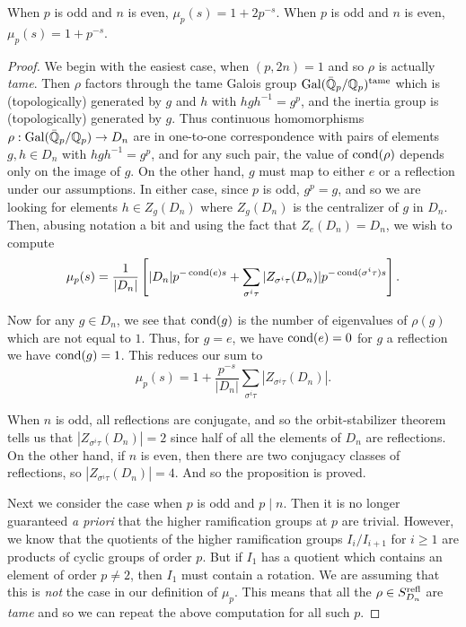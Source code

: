 \begin{prop}\label{prop:finiteprimesoddp}
  When $p$ is odd and $n$ is even, $\mu_p(s) = 1 + 2p^{-s}$. When $p$ is odd
and $n$ is even, $\mu_p(s) = 1 + p^{-s}$.
\end{prop}
\begin{proof}
We begin with the easiest case, when $(p, 2n) = 1$ and so $\rho$ is actually
{\em tame}.  Then $\rho$ factors through the tame Galois group
$\operatorname{Gal}(\Bar{\mathbb{Q}}_p/\mathbb{Q}_p)^{\mathrm{tame}}$ which is (topologically) generated by $g$ and $h$
with $hgh^{-1} = g^p$, and the inertia group is (topologically) generated by
$g$. Thus continuous homomorphisms $\rho : \operatorname{Gal}(\Bar{\mathbb{Q}}_p/\mathbb{Q}_p) \to D_n$ are in
one-to-one correspondence with pairs of elements $g, h \in D_n$ with $hgh^{-1}
= g^p$, and for any such pair, the value of $\operatorname{cond}(\rho)$ depends only on the
image of $g$.  On the other hand, $g$ must map to either $e$ or a reflection
under our assumptions. In either case, since $p$ is odd, $g^p = g$, and so we
are looking for elements $h \in Z_g(D_n)$ where $Z_g(D_n)$ is the centralizer
of $g$ in $D_n$. Then, abusing notation a bit and using the fact that $Z_e(D_n) = D_n$, we wish to compute
\[ \mu_p(s) = \frac{1}{|D_n|} \left[ |D_n| p^{-\operatorname{cond}(e) s} + \sum_{\sigma^i\tau} |Z_{\sigma^i\tau}(D_n)| p^{-\operatorname{cond}(\sigma^i\tau) s}\right]. \]

Now for any $g \in D_n$, we see that $\operatorname{cond}(g)$ is the number of eigenvalues of
$\rho(g)$ which are not equal to $1$. Thus, for $g = e$, we have $\operatorname{cond}(e) = 0$
for $g$ a reflection we have $\operatorname{cond}(g) = 1$. This reduces our sum to
\[ \mu_p(s) = 1 + \frac{p^{-s}}{|D_n|} \sum_{\sigma^i\tau} |Z_{\sigma^i\tau}(D_n)|. \]

When $n$ is odd, all reflections are conjugate, and so the orbit-stabilizer
theorem tells us that $|Z_{\sigma^i\tau}(D_n)| = 2$ since half of all the
elements of $D_n$ are reflections. On the other hand, if $n$ is even, then
there are two conjugacy classes of reflections, so $|Z_{\sigma^i\tau}(D_n)| =
4$. And so the proposition is proved.

Next we consider the case when $p$ is odd and $p \mid n$. Then it is no longer
guaranteed {\em a priori} that the higher ramification groups at $p$ are
trivial. However, we know that the quotients of the higher ramification groups
$I_i/I_{i+1}$ for $i \geq 1$ are products of cyclic groups of order $p$. But if
$I_1$ has a quotient which contains an element of order $p \ne 2$, then $I_1$
must contain a rotation. We are assuming that this is {\em not} the case in our
definition of $\mu_p$. This means that all the $\rho \in S_{D_n}^{\mathrm{refl}}$ are
{\em tame} and so we can repeat the above computation for all such $p$.
\end{proof}

